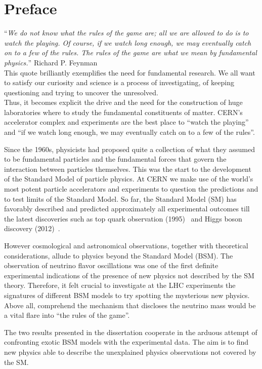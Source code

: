 \chapter*{Preface}\label{chapter:introduction}
\enquote{\itshape {\small We do not know what the rules of the game are; all we are allowed to
do is to watch the playing. Of course, if we watch long enough, we may
eventually catch on to a few of the rules. The rules of the game are
what we mean by fundamental physics.}} Richard P. Feynman\\
This quote brilliantly exemplifies the need for fundamental
research. We all want to satisfy our 
curiosity and science is a process of investigating, of keeping
questioning and trying to uncover the unresolved.\\
Thus, it becomes explicit the drive and the need for the construction
of huge laboratories where to study the fundamental constituents of
matter.
CERN's accelerator complex and experiments are the
best place to ``watch the playing'' and ``if we watch long enough, we may
eventually catch on to a few of the rules''.

Since the 1960s, physicists had proposed quite a collection of what
they assumed to be fundamental particles and the fundamental forces
 that govern the interaction between particles themselves. This was
 the start to the development of the Standard Model of particle
 physics. At CERN we make use of the world's
most potent particle accelerators and experiments to question the
predictions and to test limits of the Standard Model. So far,
the Standard Model (SM) has favorably described and predicted
approximately all experimental outcomes till the latest
discoveries such as top quark observation (1995)~\cite{Abachi_1995}
and Higgs boson discovery (2012)~\cite{20121,201230}.

However cosmological and astronomical observations, together with theoretical
considerations, allude to physics beyond the Standard Model (BSM).
The observation of neutrino flavor oscillations was one of the first 
definite experimental indications of the
presence of new physics not described by the SM theory.
 Therefore, it felt crucial to investigate at the LHC
experiments the signatures of different BSM models
to try spotting the mysterious new physics. Above all, comprehend the
mechanism that discloses the neutrino mass would be a
vital flare into ``the rules of the game''.

The two results presented in the dissertation cooperate in the arduous attempt of confronting exotic BSM
models with the experimental data. The aim is to find new
physics able to describe the unexplained
physics observations not covered by the SM.\\

